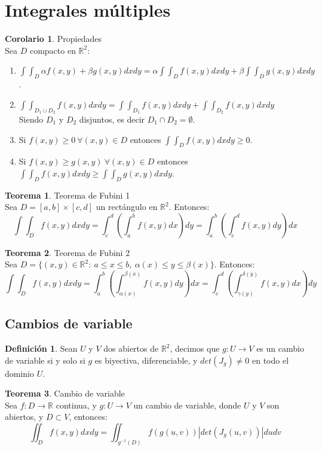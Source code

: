 \documentclass[10pt]{article}
\theoremstyle{definition}
\newtheorem{definition}{Definición}[section]
\newtheorem{theorem}{Teorema}[section]
\newtheorem{corollary}{Corolario}[theorem]
\begin{document}
\newpage\section{Integrales múltiples}
\begin{corollary}{Propiedades}
    \\Sea $D$ compacto en $\mathbb{R}^2$:
    \begin{enumerate}
        \item $\int\int_D\alpha f(x,y)+\beta g(x,y)dxdy=\alpha\int\int_Df(x,y)dxdy+\beta\int\int_Dg(x,y)dxdy$.
        \item $\int\int_{D_1\cup D_2}f(x,y)dxdy=\int\int_{D_1}f(x,y)dxdy+\int\int_{D_2}f(x,y)dxdy$\\Siendo $D_1$ y $D_2$ disjuntos, es decir $D_1\cap D_2=\emptyset$.
        \item Si $f(x,y)\ge0\ \forall(x,y)\in D$ entonces $\int\int_Df(x,y)dxdy\ge0$.
        \item Si $f(x,y)\ge g(x,y)\ \forall(x,y)\in D$ entonces $\int\int_Df(x,y)dxdy\ge\int\int_Dg(x,y)dxdy$.
    \end{enumerate}
\end{corollary}
\begin{theorem}{Teorema de Fubini 1}
    \\Sea $D=[a,b]\times[c,d]$ un rectángulo en $\mathbb{R}^2$. Entonces:$$\int\int_Df(x,y)dxdy=\int_{c}^{d}\left( \int_{a}^{b} f(x,y) dx \right) dy=\int_{a}^{b} \left( \int_{c}^{d} f(x,y) dy \right)  dx$$
\end{theorem}
\begin{theorem}{Teorema de Fubini 2}
    \\Sea $D=\{(x,y)\in\mathbb{R}^2:\ a\le x\le b,\ \alpha(x)\le y\le \beta(x)\}$. Entonces: $$\int\int_Df(x,y)dxdy=\int_{a}^{b} \left( \int_{\alpha(x)}^{\beta(x)} f(x,y) dy \right)  dx=\int_{c}^{d} \left( \int_{\gamma(y)}^{\delta(y)} f(x,y) dx \right)  dy$$
\end{theorem}
\subsection{Cambios de variable}
\begin{definition}
    Sean $U$ y $V$ dos abiertos de $\mathbb{R}^2$, decimos que $g:U\to V$ es un cambio de variable si y solo si $g$ es biyectiva, diferenciable, y $det(J_g)\neq 0$ en todo el dominio $U$.
\end{definition}
\begin{theorem}{Cambio de variable}
    \\Sea $f:D\to\mathbb{R}$ continua, y $g:U\to V$ un cambio de variable, donde $U$ y $V$ son abiertos, y $D\subset V$, entonces:$$\iint_Df(x,y)dxdy=\iint_{g^{-1}(D)}f(g(u,v))|det(J_g(u,v))|dudv$$
\end{theorem}
\end{document}
